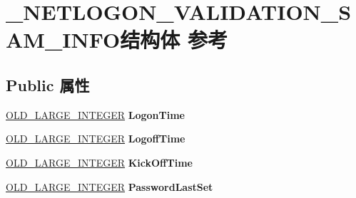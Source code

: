 \hypertarget{struct___n_e_t_l_o_g_o_n___v_a_l_i_d_a_t_i_o_n___s_a_m___i_n_f_o}{}\section{\+\_\+\+N\+E\+T\+L\+O\+G\+O\+N\+\_\+\+V\+A\+L\+I\+D\+A\+T\+I\+O\+N\+\_\+\+S\+A\+M\+\_\+\+I\+N\+F\+O结构体 参考}
\label{struct___n_e_t_l_o_g_o_n___v_a_l_i_d_a_t_i_o_n___s_a_m___i_n_f_o}
\subsection*{Public 属性}
\begin{DoxyCompactItemize}
\item 
\mbox{\label{struct___n_e_t_l_o_g_o_n___v_a_l_i_d_a_t_i_o_n___s_a_m___i_n_f_o_aad23fa7e5d56349a4a8476ba1eae93ee}} 
\hyperlink{struct___o_l_d___l_a_r_g_e___i_n_t_e_g_e_r}{O\+L\+D\+\_\+\+L\+A\+R\+G\+E\+\_\+\+I\+N\+T\+E\+G\+ER} {\bfseries Logon\+Time}
\item 
\mbox{\label{struct___n_e_t_l_o_g_o_n___v_a_l_i_d_a_t_i_o_n___s_a_m___i_n_f_o_a7a086765a142b82d8a15aa54b67bc9e7}} 
\hyperlink{struct___o_l_d___l_a_r_g_e___i_n_t_e_g_e_r}{O\+L\+D\+\_\+\+L\+A\+R\+G\+E\+\_\+\+I\+N\+T\+E\+G\+ER} {\bfseries Logoff\+Time}
\item 
\mbox{\label{struct___n_e_t_l_o_g_o_n___v_a_l_i_d_a_t_i_o_n___s_a_m___i_n_f_o_a3e9ba8f0226b4f3d4a1743baf7a3f207}} 
\hyperlink{struct___o_l_d___l_a_r_g_e___i_n_t_e_g_e_r}{O\+L\+D\+\_\+\+L\+A\+R\+G\+E\+\_\+\+I\+N\+T\+E\+G\+ER} {\bfseries Kick\+Off\+Time}
\item 
\mbox{\label{struct___n_e_t_l_o_g_o_n___v_a_l_i_d_a_t_i_o_n___s_a_m___i_n_f_o_a4a68c4e8fd5b4aa317ee194a6c2ce821}} 
\hyperlink{struct___o_l_d___l_a_r_g_e___i_n_t_e_g_e_r}{O\+L\+D\+\_\+\+L\+A\+R\+G\+E\+\_\+\+I\+N\+T\+E\+G\+ER} {\bfseries Password\+Last\+Set}
\item 
\mbox{\label{struct___n_e_t_l_o_g_o_n___v_a_l_i_d_a_t_i_o_n___s_a_m___i_n_f_o_a4ac0db3770b86888797dd4a576eb28d0}} 

\end{DoxyCompactItemize}
